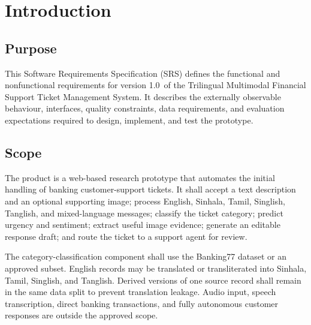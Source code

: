 \documentclass[10pt,letterpaper]{article}
\newcommand{\projectname}{Trilingual Multimodal Financial Support Ticket Management System}
\newcommand{\documentversion}{1.0}
\newenvironment{templatebody}{\par\justifying\setlength{\emergencystretch}{3em}}{\par}
\begin{document}
\begin{templatebody}
\section{Introduction}

\subsection{Purpose}
This Software Requirements Specification (SRS) defines the functional and nonfunctional requirements for version \documentversion\ of the \projectname. It describes the externally observable behaviour, interfaces, quality constraints, data requirements, and evaluation expectations required to design, implement, and test the prototype.

\subsection{Scope}
The product is a web-based research prototype that automates the initial handling of banking customer-support tickets. It shall accept a text description and an optional supporting image; process English, Sinhala, Tamil, Singlish, Tanglish, and mixed-language messages; classify the ticket category; predict urgency and sentiment; extract useful image evidence; generate an editable response draft; and route the ticket to a support agent for review.

The category-classification component shall use the Banking77 dataset or an approved subset. English records may be translated or transliterated into Sinhala, Tamil, Singlish, and Tanglish. Derived versions of one source record shall remain in the same data split to prevent translation leakage. Audio input, speech transcription, direct banking transactions, and fully autonomous customer responses are outside the approved scope.


\end{templatebody}
\end{document}
